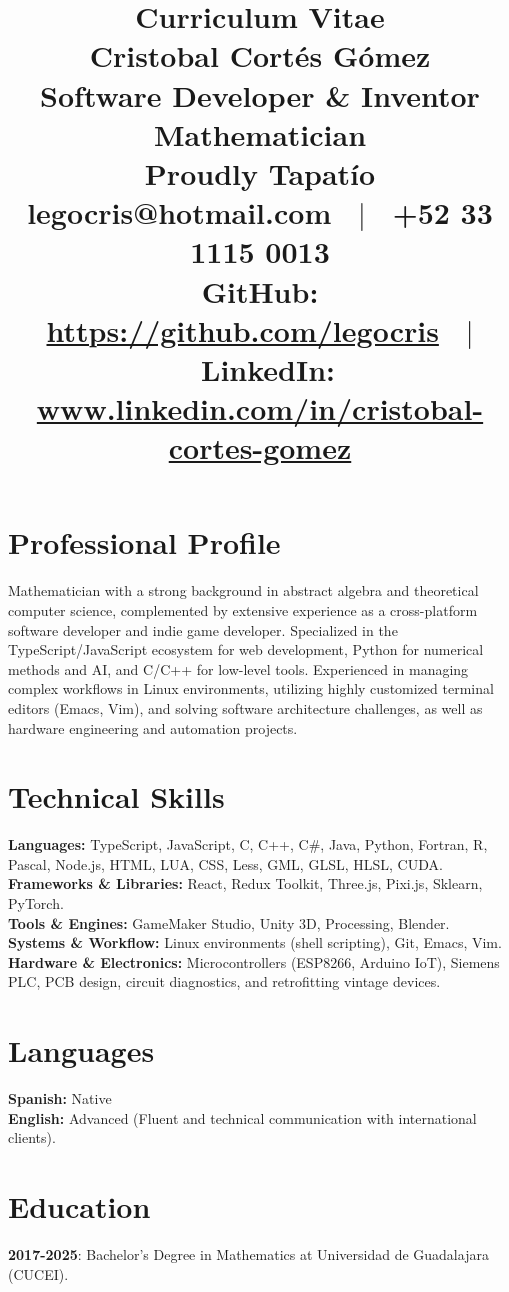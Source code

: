 \documentclass{article}
\title{\vspace{-1.5cm} Curriculum Vitae \\ \Huge{Cristobal Cortés Gómez} \\ \large{Software Developer \& Inventor Mathematician} \\ \normalsize{Proudly Tapatío} \\ 
\vspace{0.3cm}
\normalsize{
legocris@hotmail.com \ $|$ \ +52 33 1115 0013 \\
GitHub: \url{https://github.com/legocris} \ $|$ \ LinkedIn: \url{www.linkedin.com/in/cristobal-cortes-gomez}
}
\vspace{-1cm}}
\author{}
\date{}
\begin{document}
\maketitle

\section*{Professional Profile}
Mathematician with a strong background in abstract algebra and theoretical computer science, complemented by extensive experience as a cross-platform software developer and indie game developer. Specialized in the TypeScript/JavaScript ecosystem for web development, Python for numerical methods and AI, and C/C++ for low-level tools. Experienced in managing complex workflows in Linux environments, utilizing highly customized terminal editors (Emacs, Vim), and solving software architecture challenges, as well as hardware engineering and automation projects.

\section*{Technical Skills}
\textbf{Languages:} TypeScript, JavaScript, C, C++, C\#, Java, Python, Fortran, R, Pascal, Node.js, HTML, LUA, CSS, Less, GML, GLSL, HLSL, CUDA. \\
\textbf{Frameworks \& Libraries:} React, Redux Toolkit, Three.js, Pixi.js, Sklearn, PyTorch. \\
\textbf{Tools \& Engines:} GameMaker Studio, Unity 3D, Processing, Blender. \\
\textbf{Systems \& Workflow:} Linux environments (shell scripting), Git, Emacs, Vim. \\
\textbf{Hardware \& Electronics:} Microcontrollers (ESP8266, Arduino IoT), Siemens PLC, PCB design, circuit diagnostics, and retrofitting vintage devices.

\section*{Languages}
\textbf{Spanish:} Native \\
\textbf{English:} Advanced (Fluent and technical communication with international clients).

\section*{Education}

\textbf{2017-2025}: Bachelor's Degree in Mathematics at Universidad de Guadalajara (CUCEI).
\end{document}

